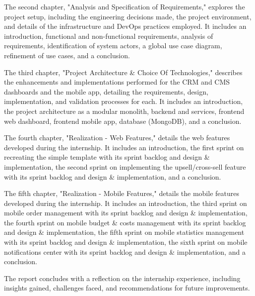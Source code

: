 The second chapter, "Analysis and Specification of Requirements," explores the project setup, including the engineering decisions made, the project environment, and details of the infrastructure and DevOps practices employed. It includes an introduction, functional and non-functional requirements, analysis of requirements, identification of system actors, a global use case diagram, refinement of use cases, and a conclusion.

The third chapter, "Project Architecture \& Choice Of Technologies," describes the enhancements and implementations performed for the CRM and CMS dashboards and the mobile app, detailing the requirements, design, implementation, and validation processes for each. It includes an introduction, the project architecture as a modular monolith, backend and services, frontend web dashboard, frontend mobile app, database (MongoDB), and a conclusion.

The fourth chapter, "Realization - Web Features," details the web features developed during the internship. It includes an introduction, the first sprint on recreating the simple template with its sprint backlog and design \& implementation, the second sprint on implementing the upsell/cross-sell feature with its sprint backlog and design \& implementation, and a conclusion.

The fifth chapter, "Realization - Mobile Features," details the mobile features developed during the internship. It includes an introduction, the third sprint on mobile order management with its sprint backlog and design \& implementation, the fourth sprint on mobile budget \& costs management with its sprint backlog and design \& implementation, the fifth sprint on mobile statistics management with its sprint backlog and design \& implementation, the sixth sprint on mobile notifications center with its sprint backlog and design \& implementation, and a conclusion.

The report concludes with a reflection on the internship experience, including insights gained, challenges faced, and recommendations for future improvements.
